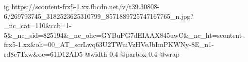  
 
 
 
 

\ifcmt
  ig https://scontent-frx5-1.xx.fbcdn.net/v/t39.30808-6/269793745_3182523625310799_8571889725747167765_n.jpg?_nc_cat=110&ccb=1-5&_nc_sid=825194&_nc_ohc=GYBuPG7dEIAAX845uwC&_nc_ht=scontent-frx5-1.xx&oh=00_AT_scrLwq63U2TWuiVzHVeJbImPKWNy-8E_n1-rd8c7Txw&oe=61D12AD5
  @width 0.4
  @parbox 0.4
  @wrap \parpic[r]
\fi
